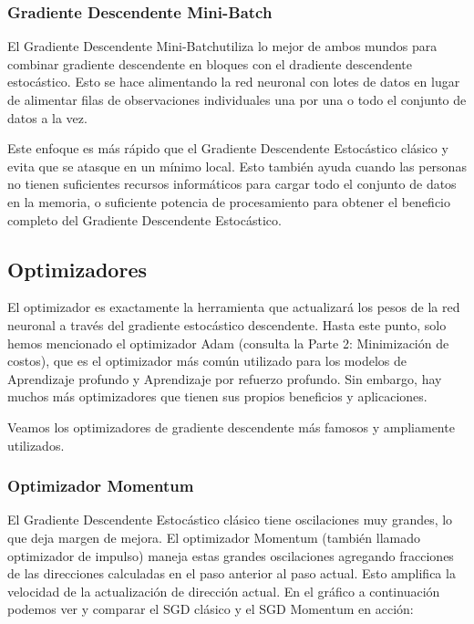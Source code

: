 \documentclass[]{book}
\begin{document}
\hypertarget{gradiente-descendente-mini-batch}{%
\subsubsection{Gradiente Descendente Mini-Batch}\label{gradiente-descendente-mini-batch}}

El Gradiente Descendente Mini-Batchutiliza lo mejor de ambos mundos para combinar gradiente descendente en bloques con el dradiente descendente estocástico. Esto se hace alimentando la red neuronal con lotes de datos en lugar de alimentar filas de observaciones individuales una por una o todo el conjunto de datos a la vez.

Este enfoque es más rápido que el Gradiente Descendente Estocástico clásico y evita que se atasque en un mínimo local. Esto también ayuda cuando las personas no tienen suficientes recursos informáticos para cargar todo el conjunto de datos en la memoria, o suficiente potencia de procesamiento para obtener el beneficio completo del Gradiente Descendente Estocástico.

\hypertarget{optimizadores}{%
\subsection{Optimizadores}\label{optimizadores}}

El optimizador es exactamente la herramienta que actualizará los pesos de la red neuronal a través del gradiente estocástico descendente. Hasta este punto, solo hemos mencionado el optimizador Adam (consulta la Parte 2: Minimización de costos), que es el optimizador más común utilizado para los modelos de Aprendizaje profundo y Aprendizaje por refuerzo profundo. Sin embargo, hay muchos más optimizadores que tienen sus propios beneficios y aplicaciones.

Veamos los optimizadores de gradiente descendente más famosos y ampliamente utilizados.

\hypertarget{optimizador-momentum}{%
\subsubsection{Optimizador Momentum}\label{optimizador-momentum}}

El Gradiente Descendente Estocástico clásico tiene oscilaciones muy grandes, lo que deja margen de mejora. El optimizador Momentum (también llamado optimizador de impulso) maneja estas grandes oscilaciones agregando fracciones de las direcciones calculadas en el paso anterior al paso actual. Esto amplifica la velocidad de la actualización de dirección actual. En el gráfico a continuación podemos ver y comparar el SGD clásico y el SGD Momentum en acción:
\end{document}
